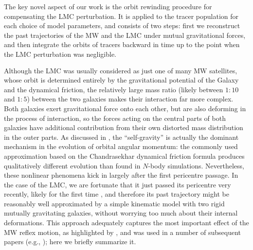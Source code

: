 \documentclass[usenatbib,fleqn]{mnras}
\begin{document}
The key novel aspect of our work is the orbit rewinding procedure for compensating the LMC perturbation. It is applied to the tracer population for each choice of model parameters, and consists of two steps: first we reconstruct the past trajectories of the MW and the LMC under mutual gravitational forces, and then integrate the orbits of tracers backward in time up to the point when the LMC perturbation was negligible.

Although the LMC was usually considered as just one of many MW satellites, whose orbit is determined entirely by the gravitational potential of the Galaxy and the dynamical friction, the relatively large mass ratio (likely between $1:10$ and $1:5$) between the two galaxies makes their interaction far more complex. Both galaxies exert gravitational force onto each other, but are also deforming in the process of interaction, so the forces acting on the central parts of both galaxies have additional contribution from their own distorted mass distribution in the outer parts. As discussed in \citet{Vasiliev2021c}, the ``self-gravity'' is actually the dominant mechanism in the evolution of orbital angular momentum: the commonly used approximation based on the Chandrasekhar dynamical friction formula produces qualitatively different evolution than found in $N$-body simulations. Nevertheless, these nonlinear phenomena kick in largely after the first pericentre passage. In the case of the LMC, we are fortunate that it just passed its pericentre very recently, likely for the first time \citep[e.g.,][]{Kallivayalil2013}, and therefore its past trajectory might be reasonably well approximated by a simple kinematic model with two rigid mutually gravitating galaxies, without worrying too much about their internal deformations. This approach adequately captures the most important effect of the MW reflex motion, as highlighted by \citet{Gomez2015}, and was used in a number of subsequent papers (e.g., \citealt{Jethwa2016,Erkal2019, Vasiliev2021b, Shipp2021}); here we briefly summarize it.
\end{document}

